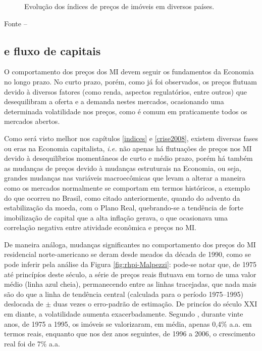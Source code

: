 \documentclass[
	12pt,				%
	oneside,			%
	a4paper,			%
	chapter=TITLE,		%
	section=TITLE,		%
	english,			%
	brazil				%
	]{abntex2}
\newcommand{\bcenter}{\begin{center}}
\newcommand{\ecenter}{\end{center}}
\begin{document}
\begin{refsection}
\begin{figure}[H]
{}

\caption{Evolução dos índices de preços de imóveis em diversos países.}\label{fig:several-indices}
\end{figure}
\bcenter

\small Fonte -- \textcite[p.~3]{regulation}
\ecenter

\hypertarget{e-fluxo-de-capitais}{%
\subsection{\texorpdfstring{ e fluxo de capitais}{ e fluxo de capitais}}\label{e-fluxo-de-capitais}}

O comportamento dos preços dos \gls{MI} devem seguir os fundamentos da Economia
no longo prazo. No curto prazo, porém, como já foi observados, os preços flutuam
devido à diversos fatores (como renda, aspectos regulatórios, entre outros) que
desequilibram a oferta e a demanda nestes mercados, ocasionando uma determinada
volatilidade nos preços, como é comum em praticamente todos os mercados abertos.

Como será visto melhor nos capítulos \ref{indices} e \ref{crise2008}, existem
diversas fases ou eras na Economia capitalista, \emph{i.e.} não apenas há flutuações
de preços nos \gls{MI} devido à desequilíbrios momentâneos de curto e médio
prazo, porém há também as mudanças de preços devido à mudanças estruturais na
Economia, ou seja, grandes mudanças nas variáveis macroecômicas que levam a
alterar a maneira como os mercados normalmente se comportam em termos
históricos, a exemplo do que ocorreu no Brasil, como citado anteriormente,
quando do advento da estabilização da moeda, com o Plano Real, quebrando-se a
tendência de forte imobilização de capital que a alta inflação gerava, o que
ocasionava uma correlação negativa entre atividade econômica e preços no
\gls{MI}.

De maneira análoga, mudanças significantes no comportamento dos preços do
\gls{MI} residencial norte-americano se deram desde meados da década de 1990,
como se pode inferir pela análise da Figura \ref{fig:rhpi-Malpezzi}: pode-se
notar que, de 1975 até princípíos deste século, a série de preços reais flutuava
em torno de uma valor médio (linha azul cheia), permanecendo entre as linhas
tracejadas, que nada mais são do que a linha de tendência central (calculada
para o período 1975--1995) deslocada de \(\pm\) duas vezes o erro-padrão de
estimação. De princíos do século XXI em diante, a volatilidade aumenta
exacerbadamente. Segundo \textcite{malpezziCapitalFlows}, durante vinte anos, de 1975 a
1995, os imóveis se valorizaram, em média, apenas 0,4\% a.a. em termos reais,
enquanto que nos dez anos seguintes, de 1996 a 2006, o crescimento real foi de
7\% a.a.
\begin{figure}[H]


\end{figure}
\end{refsection}
\end{document}
